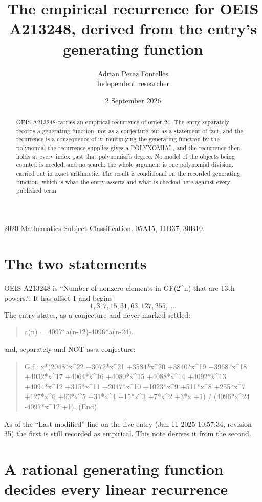 \documentclass[11pt,a4paper]{article}
\title{The empirical recurrence for OEIS A213248, derived from the entry's generating function}
\author{Adrian Perez Fontelles\\ \small Independent researcher}
\date{2 September 2026}
\theoremstyle{plain}
\theoremstyle{definition}
\begin{document}
\maketitle

\begin{abstract}
OEIS A213248 carries an empirical recurrence of order $24$. The entry separately records a
generating function, not as a conjecture but as a statement of fact, and the recurrence is a
consequence of it: multiplying the generating function by the polynomial the recurrence
supplies gives a POLYNOMIAL, and the recurrence then holds at every index past that
polynomial's degree. No model of the objects being counted is needed, and no search: the
whole argument is one polynomial division, carried out in exact arithmetic. The result is
conditional on the recorded generating function, which is what the entry asserts and what is
checked here against every published term.
\end{abstract}

\noindent\small 2020 Mathematics Subject Classification. 05A15, 11B37, 30B10.\normalsize

\section{The two statements}

OEIS A213248 is ``Number of nonzero elements in GF(2\^{}n) that are 13th powers.''. It has offset $1$ and begins
\[
1, 3, 7, 15, 31, 63, 127, 255,\ \dots
\]
The entry states, as a conjecture and never marked settled:
\begin{quote}
a(n) = 4097*a(n-12)-4096*a(n-24).
\end{quote}
and, separately and NOT as a conjecture:
\begin{quote}
G.f.: x*(2048*x\^{}22 +3072*x\^{}21 +3584*x\^{}20 +3840*x\^{}19 +3968*x\^{}18 +4032*x\^{}17 +4064*x\^{}16 +4080*x\^{}15 +4088*x\^{}14 +4092*x\^{}13 +4094*x\^{}12 +315*x\^{}11 +2047*x\^{}10 +1023*x\^{}9 +511*x\^{}8 +255*x\^{}7 +127*x\^{}6 +63*x\^{}5 +31*x\^{}4 +15*x\^{}3 +7*x\^{}2 +3*x +1) / (4096*x\^{}24 -4097*x\^{}12 +1). (End)
\end{quote}
As of the ``Last modified'' line on the live entry (Jan 11 2025 10:57:34, revision 35) the first is still
recorded as empirical. This note derives it from the second.

\section{A rational generating function decides every linear recurrence}
\end{document}
